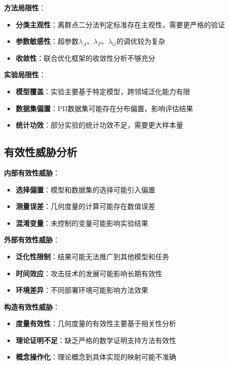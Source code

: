 \textbf{方法局限性}：
\begin{itemize}
\item \textbf{分类主观性}：离群点二分法判定标准存在主观性，需要更严格的验证
\item \textbf{参数敏感性}：超参数$\lambda_A$、$\lambda_P$、$\lambda_G$的调优较为复杂
\item \textbf{收敛性}：联合优化框架的收敛性分析不够充分
\end{itemize}

\textbf{实验局限性}：
\begin{itemize}
\item \textbf{模型覆盖}：实验主要基于特定模型，跨领域泛化能力有限
\item \textbf{数据集偏置}：PII数据集可能存在分布偏置，影响评估结果
\item \textbf{统计功效}：部分实验的统计功效不足，需要更大样本量
\end{itemize}

\subsection{有效性威胁分析}

\textbf{内部有效性威胁}：
\begin{itemize}
\item \textbf{选择偏置}：模型和数据集的选择可能引入偏置
\item \textbf{测量误差}：几何度量的计算可能存在数值误差
\item \textbf{混淆变量}：未控制的变量可能影响实验结果
\end{itemize}

\textbf{外部有效性威胁}：
\begin{itemize}
\item \textbf{泛化性限制}：结果可能无法推广到其他模型和任务
\item \textbf{时间效应}：攻击技术的发展可能影响长期有效性
\item \textbf{环境差异}：不同部署环境可能影响方法效果
\end{itemize}

\textbf{构造有效性威胁}：
\begin{itemize}
\item \textbf{度量有效性}：几何度量的有效性主要基于相关性分析
\item \textbf{理论证明不足}：缺乏严格的数学证明支持方法有效性
\item \textbf{概念操作化}：理论概念到具体实现的映射可能不准确
\end{itemize}

